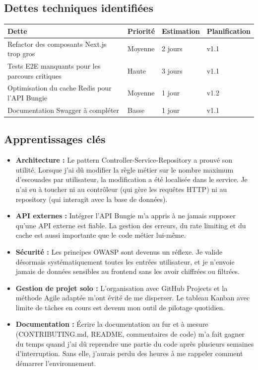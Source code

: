 \subsection*{Dettes techniques identifiées}

\begin{center}
\begin{tabular}{|l|l|l|l|}
\hline
\textbf{Dette} & \textbf{Priorité} & \textbf{Estimation} & \textbf{Planification} \\
\hline
Refactor des composants Next.js trop gros & Moyenne & 2 jours & v1.1 \\
Tests E2E manquants pour les parcours critiques & Haute & 3 jours & v1.1 \\
Optimisation du cache Redis pour l'API Bungie & Moyenne & 1 jour & v1.2 \\
Documentation Swagger à compléter & Basse & 1 jour & v1.1 \\
\hline
\end{tabular}
\end{center}

\subsection*{Apprentissages clés}

\begin{itemize}
    \item \textbf{Architecture :} Le pattern Controller-Service-Repository a prouvé son utilité. Lorsque j'ai dû modifier la règle métier sur le nombre maximum d'escouades par utilisateur, la modification a été localisée dans le service. Je n'ai eu à toucher ni au contrôleur (qui gère les requêtes HTTP) ni au repository (qui interagit avec la base de données).
    
    \item \textbf{API externes :} Intégrer l'API Bungie m'a appris à ne jamais supposer qu'une API externe est fiable. La gestion des erreurs, du rate limiting et du cache est aussi importante que le code métier lui-même.
    
    \item \textbf{Sécurité :} Les principes OWASP sont devenus un réflexe. Je valide désormais systématiquement toutes les entrées utilisateur, et je n'envoie jamais de données sensibles au frontend sans les avoir chiffrées ou filtrées.
    
    \item \textbf{Gestion de projet solo :} L'organisation avec GitHub Projects et la méthode Agile adaptée m'ont évité de me disperser. Le tableau Kanban avec limite de tâches en cours est devenu mon outil de pilotage quotidien.
    
    \item \textbf{Documentation :} Écrire la documentation au fur et à mesure (CONTRIBUTING.md, README, commentaires de code) m'a fait gagner du temps quand j'ai dû reprendre une partie du code après plusieurs semaines d'interruption. Sans elle, j'aurais perdu des heures à me rappeler comment démarrer l'environnement.
\end{itemize}